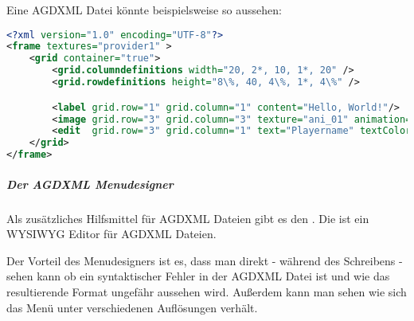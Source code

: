 Eine  AGDXML Datei könnte beispielsweise so aussehen:

\begin{lstlisting}[caption=Eine Beispiel AGDXML Menü Definition, title=\hspace{0 pt}, language=xml]
<?xml version="1.0" encoding="UTF-8"?>
<frame textures="provider1" >
	<grid container="true">
		<grid.columndefinitions width="20, 2*, 10, 1*, 20" />
		<grid.rowdefinitions height="8\%, 40, 4\%, 1*, 4\%" />

		<label grid.row="1" grid.column="1" content="Hello, World!"/>
		<image grid.row="3" grid.column="3" texture="ani_01" animation="750" id="myImage"/>
		<edit  grid.row="3" grid.column="1" text="Playername" textColor="BLACK" halign="LEFT" />
	</grid>
</frame>
\end{lstlisting}

\subparagraph{Der AGDXML Menudesigner}

Als zusätzliches Hilfsmittel für AGDXML Dateien gibt es den . Die ist ein WYSIWYG Editor für AGDXML Dateien.


Der Vorteil des Menudesigners ist es, dass man direkt - während des Schreibens - sehen kann ob ein syntaktischer Fehler in der AGDXML Datei ist und wie das resultierende Format ungefähr aussehen wird. Außerdem kann man sehen wie sich das Menü unter verschiedenen Auflösungen verhält.